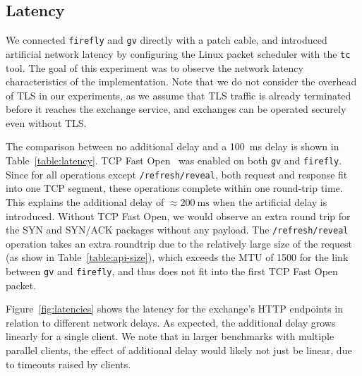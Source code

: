 \subsection{Latency}
We connected \texttt{firefly} and \texttt{gv} directly with a patch cable, and
introduced artificial network latency by configuring the Linux packet scheduler
with the \texttt{tc} tool.  The goal of this experiment was to observe the
network latency characteristics of the implementation.  Note that we do not consider
the overhead of TLS in our experiments, as we assume that TLS traffic is
already terminated before it reaches the exchange service, and exchanges can be
operated securely even without TLS.

The comparison between no additional delay and a \SI{100}{\milli\second} delay
is shown in Table~\ref{table:latency}.  TCP Fast Open~\cite{rfc7413} was
enabled on both \texttt{gv} and \texttt{firefly}.  Since for all operations
except \texttt{/refresh/reveal}, both request and response fit into one TCP
segment, these operations complete within one round-trip time.  This explains the
additional delay of $\approx \SI{200}{\milli\second}$ when the artificial delay
is introduced.  Without TCP Fast Open, we would observe an extra round trip for
the SYN and SYN/ACK packages without any payload.  The \texttt{/refresh/reveal}
operation takes an extra roundtrip due to the relatively large size of the
request (as show in Table~\ref{table:api-size}), which exceeds the MTU of 1500
for the link between \texttt{gv} and \texttt{firefly}, and thus does not fit
into the first TCP Fast Open packet.

Figure~\ref{fig:latencies} shows the latency for the exchange's HTTP endpoints
in relation to different network delays.  As expected, the additional delay
grows linearly for a single client.  We note that in larger benchmarks with
multiple parallel clients, the effect of additional delay would likely not just
be linear, due to timeouts raised by clients.

\newcommand{\specialcell}[2][c]{%
  \begin{tabular}[#1]{@{}c@{}}#2\end{tabular}}


